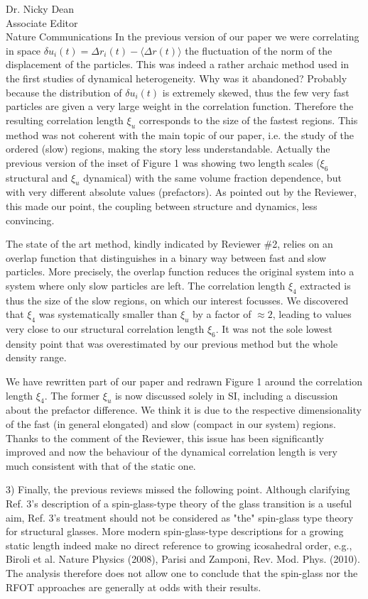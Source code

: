 \documentclass[a4paper, rebuttal, parskip=true, firsthead=false, fromemail=true, foldmarks=false]{scrlttr2}
\begin{document}
\begin{letter}{Dr. Nicky Dean\\
Associate Editor\\
Nature Communications}
In the previous version of our paper we were correlating in space $\delta u_i(t) = \Delta r_i(t)-\langle\Delta r(t)\rangle$ the fluctuation of the norm of the displacement of the particles. This was indeed a rather archaic method used in the first studies of dynamical heterogeneity. Why was it abandoned? Probably because the distribution of $\delta u_i(t)$ is extremely skewed, thus the few very fast particles are given a very large weight in the correlation function. Therefore the resulting correlation length $\xi_u$ corresponds to the size of the fastest regions. This method was not coherent with the main topic of our paper, i.e. the study of the ordered (slow) regions, making the story less understandable. Actually the previous version of the inset of Figure 1 was showing two length scales ($\xi_6$ structural and $\xi_u$ dynamical) with the same volume fraction dependence, but with very different absolute values (prefactors). As pointed out by the Reviewer, this made our point, the coupling between structure and dynamics, less convincing.

The state of the art method, kindly indicated by Reviewer \#2, relies on an overlap function that distinguishes in a binary way between fast and slow particles. More precisely, the overlap function reduces the original system into a system where only slow particles are left. The correlation length $\xi_4$ extracted is thus the size of the slow regions, on which our interest focusses. We discovered that $\xi_4$ was systematically smaller than $\xi_u$ by a factor of $\approx 2$, leading to values very close to our structural correlation length $\xi_6$. It was not the sole lowest density point that was overestimated by our previous method but the whole density range.

We have rewritten part of our paper and redrawn Figure 1 around the correlation length $\xi_4$. The former $\xi_u$ is now discussed solely in SI, including a discussion about the prefactor difference. We think it is due to the respective dimensionality of the fast (in general elongated) and slow (compact in our system) regions.
Thanks to the comment of the Reviewer, this issue has been significantly improved and now the behaviour of the dynamical correlation length is very much consistent with that 
of the static one. 

\begin{quotationi}
3) Finally, the previous reviews missed the following point. Although clarifying Ref. 3's description of a spin-glass-type theory of the glass transition is a useful aim, Ref. 3's treatment should not be considered as "the" spin-glass type theory for structural glasses. More modern spin-glass-type descriptions for a growing static length indeed make no direct reference to growing icosahedral order, e.g., Biroli et al. Nature Physics (2008), Parisi and Zamponi, Rev. Mod. Phys. (2010). The analysis therefore does not allow one to conclude that the spin-glass nor the RFOT approaches are generally at odds with their results.
\end{quotationi}


\end{letter}
\end{document}
